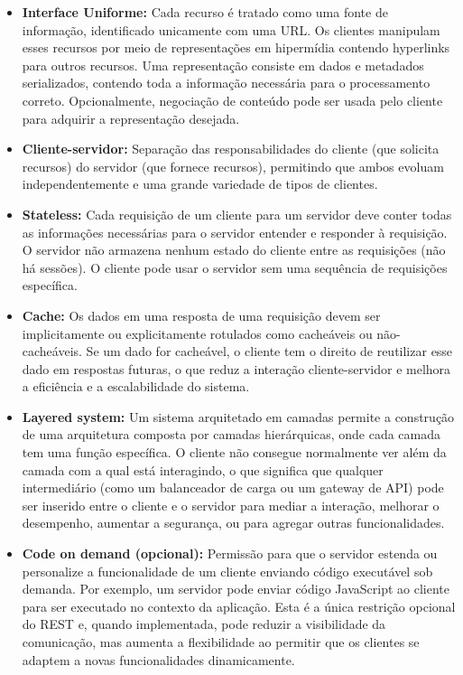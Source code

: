 \documentclass[12pt, %
openright, 
oneside, %
a4paper,    %
brazil]{facom-ufu-abntex2}
\begin{document}
\begin{itemize}
	\item \textbf{Interface Uniforme:} Cada recurso é tratado como uma
	      fonte de informação, identificado unicamente com uma URL. Os
	      clientes manipulam esses recursos por meio de representações em hipermídia
	      contendo hyperlinks para outros recursos. Uma representação consiste em dados e
	      metadados serializados, contendo toda a informação necessária para o
	      processamento correto. Opcionalmente, negociação de conteúdo pode ser usada
	      pelo cliente para adquirir a representação desejada.
	\item \textbf{Cliente-servidor:} Separação das responsabilidades do
	      cliente (que solicita recursos) do servidor (que fornece
	      recursos), permitindo que ambos evoluam independentemente e uma grande
	      variedade de tipos de clientes.
	\item \textbf{Stateless:} Cada requisição de um cliente para um
	      servidor deve conter todas as informações necessárias para o
	      servidor entender e responder à requisição. O servidor não armazena nenhum
	      estado do cliente entre as requisições (não há sessões). O cliente pode usar o
	      servidor sem uma sequência de requisições específica.
	\item \textbf{Cache:} Os dados em uma resposta de uma requisição devem
	      ser implicitamente ou explicitamente rotulados como cacheáveis ou
	      não-cacheáveis. Se um dado for cacheável, o cliente tem o direito de reutilizar
	      esse dado em respostas futuras, o que reduz a interação cliente-servidor e
	      melhora a eficiência e a escalabilidade do sistema.
	\item \textbf{Layered system:} Um sistema arquitetado em camadas
	      permite a construção de uma arquitetura composta por camadas
	      hierárquicas, onde cada camada tem uma função específica. O cliente não
	      consegue normalmente ver além da camada com a qual está interagindo, o que
	      significa que qualquer intermediário (como um balanceador de carga ou um
	      gateway de API) pode ser inserido entre o cliente e o servidor para mediar a
	      interação, melhorar o desempenho, aumentar a segurança, ou para agregar outras
	      funcionalidades.
	\item \textbf{Code on demand (opcional):} Permissão para que o servidor
	      estenda ou personalize a funcionalidade de um cliente enviando
	      código executável sob demanda. Por exemplo, um servidor pode enviar código
	      JavaScript ao cliente para ser executado no contexto da aplicação. Esta é a
	      única restrição opcional do REST e, quando implementada, pode reduzir a
	      visibilidade da comunicação, mas aumenta a flexibilidade ao permitir que os
	      clientes se adaptem a novas funcionalidades dinamicamente.
\end{itemize}
\end{document}
